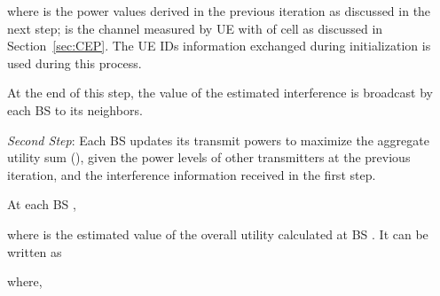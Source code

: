 \documentclass[journal]{IEEEtran}
\begin{document}
  
where  is the power values derived in the previous iteration as discussed in the next step;  is the channel measured by UE  with  of cell  as discussed in Section~\ref{sec:CEP}. The UE IDs information exchanged during initialization is used during this process.  
 
At the end of this step, the value of the estimated interference is broadcast by each BS to its neighbors. 

\textit{Second Step}: Each BS updates its transmit powers to maximize the aggregate utility sum (), given the power levels of other transmitters at the previous iteration, and the interference information received in the first step. 

At each BS ,

where  is the estimated value of the overall utility calculated at BS . It can be written as
 
where,
\end{document}
